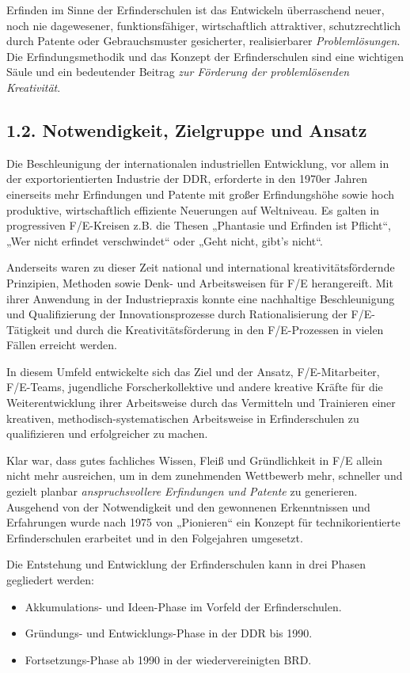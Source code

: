 \documentclass[11pt,a4paper]{article}
\begin{document}
Erfinden im Sinne der Erfinderschulen ist das Entwickeln überraschend neuer,
noch nie dagewesener, funktionsfähiger, wirtschaftlich attraktiver,
schutzrechtlich durch Patente oder Gebrauchsmuster gesicherter, realisierbarer
\emph{Problemlösungen}. Die Erfindungsmethodik und das Konzept der
Erfinderschulen sind eine wichtigen Säule und ein bedeutender Beitrag
\emph{zur Förderung der problemlösenden Kreativität}.

\subsection*{1.2. Notwendigkeit, Zielgruppe und Ansatz}
Die Beschleunigung der internationalen industriellen Entwicklung, vor allem in
der exportorientierten Industrie der DDR, erforderte in den 1970er Jahren
einerseits mehr Erfindungen und Patente mit großer Erfindungshöhe sowie hoch
produktive, wirtschaftlich effiziente Neuerungen auf Weltniveau. Es galten in
progressiven F/E-Kreisen z.B. die Thesen „Phantasie und Erfinden ist Pflicht“,
„Wer nicht erfindet verschwindet“ oder „Geht nicht, gibt’s nicht“.

Anderseits waren zu dieser Zeit national und international
kreativitätsfördernde Prinzipien, Methoden sowie Denk- und Arbeitsweisen für
F/E herangereift. Mit ihrer Anwendung in der Industriepraxis konnte eine
nachhaltige Beschleunigung und Qualifizierung der Innovationsprozesse durch
Rationalisierung der F/E-Tätigkeit und durch die Kreativitätsförderung in den
F/E-Prozessen in vielen Fällen erreicht werden.

In diesem Umfeld entwickelte sich das Ziel und der Ansatz, F/E-Mitarbeiter,
F/E-Teams, jugendliche Forscherkollektive und andere kreative Kräfte für die
Weiterentwicklung ihrer Arbeitsweise durch das Vermitteln und Trainieren einer
kreativen, methodisch-systematischen Arbeitsweise in Erfinderschulen zu
qualifizieren und erfolgreicher zu machen.

Klar war, dass gutes fachliches Wissen, Fleiß und Gründlichkeit in F/E allein
nicht mehr ausreichen, um in dem zunehmenden Wettbewerb mehr, schneller und
gezielt planbar \emph{anspruchsvollere Erfindungen und Patente} zu generieren.
Ausgehend von der Notwendigkeit und den gewonnenen Erkenntnissen und
Erfahrungen wurde nach 1975 von „Pionieren“ ein Konzept für technikorientierte
Erfinderschulen erarbeitet und in den Folgejahren umgesetzt.

Die Entstehung und Entwicklung der Erfinderschulen kann in drei Phasen
gegliedert werden:
\begin{itemize}
\item Akkumulations- und Ideen-Phase im Vorfeld der Erfinderschulen.
\item Gründungs- und Entwicklungs-Phase in der DDR bis 1990.
\item Fortsetzungs-Phase ab 1990 in der wiedervereinigten BRD.
\end{itemize}
\end{document}
